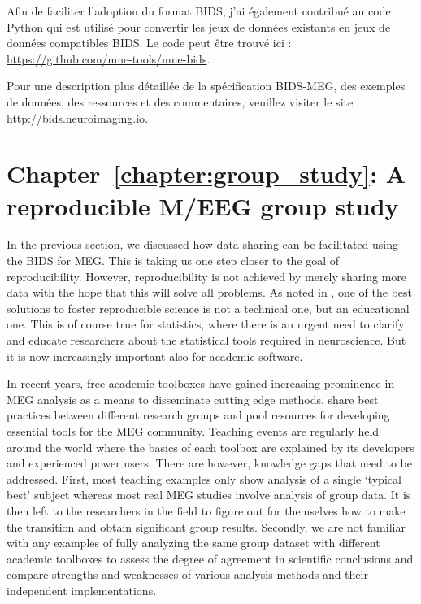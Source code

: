 Afin de faciliter l'adoption du format BIDS, j'ai également contribué au code Python qui est utilisé pour convertir les jeux de données existants en jeux de données compatibles BIDS. Le code peut être trouvé ici : \url{https://github.com/mne-tools/mne-bids}. 

Pour une description plus détaillée de la spécification BIDS-MEG, des exemples de données, des ressources et des commentaires, veuillez visiter le site \url{http://bids.neuroimaging.io}.

\section*{Chapter~\ref{chapter:group_study}: A reproducible M/EEG group study}

In the previous section, we discussed how data sharing can be facilitated using the \ac{BIDS} for \ac{MEG}. This is taking us one step closer to the goal of reproducibility. However, reproducibility is not achieved by merely sharing more data with the hope that this will solve all problems. As noted in \citet{baker20161}, one of the best solutions to foster reproducible science is not a technical one, but an educational one. This is of course true for statistics, where there is an urgent need to clarify and educate researchers about the statistical tools required in neuroscience. But it is now increasingly important also for academic software.

In recent years, free academic toolboxes have gained increasing prominence in \ac{MEG} analysis as a means to disseminate cutting edge methods, share best practices between different research groups and pool resources for developing essential tools for the \ac{MEG} community. Teaching events are regularly held around the world where the basics of each toolbox are explained by its  developers and experienced power users. There are however, knowledge gaps that need to be addressed. First, most teaching examples only show analysis of a single ‘typical best’ subject whereas most real MEG studies involve analysis of group data. It is then left to the researchers in the field to figure out for themselves how to make the transition and obtain significant group results. Secondly, we are not familiar with any examples of fully analyzing the same group dataset with different academic toolboxes to assess the degree of agreement in scientific conclusions and compare strengths and weaknesses of various analysis methods and their independent implementations.

